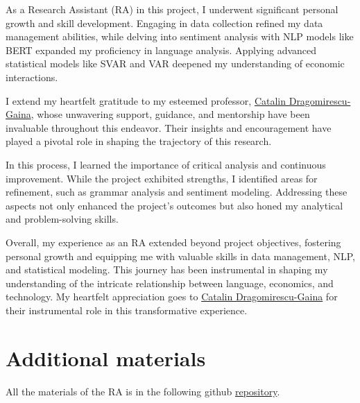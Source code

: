 \documentclass{article}
\begin{document}
As a Research Assistant (RA) in this project, I underwent significant personal growth and skill development. Engaging in data collection refined my data management abilities, while delving into sentiment analysis with NLP models like BERT expanded my proficiency in language analysis. Applying advanced statistical models like SVAR and VAR deepened my understanding of economic interactions.
\par
I extend my heartfelt gratitude to my esteemed professor, \href{https://scholar.google.it/citations?user=noRmx74AAAAJ&hl=en}{Catalin Dragomirescu-Gaina}, whose unwavering support, guidance, and mentorship have been invaluable throughout this endeavor. Their insights and encouragement have played a pivotal role in shaping the trajectory of this research.
\par
In this process, I learned the importance of critical analysis and continuous improvement. While the project exhibited strengths, I identified areas for refinement, such as grammar analysis and sentiment modeling. Addressing these aspects not only enhanced the project's outcomes but also honed my analytical and problem-solving skills.
\par
Overall, my experience as an RA extended beyond project objectives, fostering personal growth and equipping me with valuable skills in data management, NLP, and statistical modeling. This journey has been instrumental in shaping my understanding of the intricate relationship between language, economics, and technology. My heartfelt appreciation goes to \href{https://scholar.google.it/citations?user=noRmx74AAAAJ&hl=en}{Catalin Dragomirescu-Gaina} for their instrumental role in this transformative experience.
\section{Additional materials}
All the materials of the RA is in the following github \href{https://github.com/RickyJ99/RA-project}{repository}.
\medskip



\end{document}

